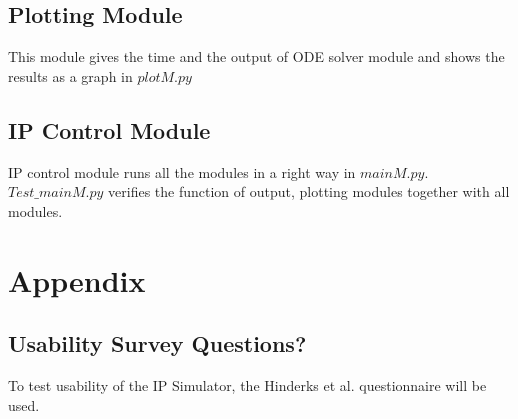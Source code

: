 \documentclass[12pt, titlepage]{article}
\begin{document}
\subsection{Plotting Module}
This module gives the time and the output of ODE solver module and shows the results as a graph in $plotM.py$
\subsection{IP Control Module}
IP control module runs all the modules in a right way in $mainM.py$. $Test\_mainM.py$ verifies the function of output, plotting modules together with all modules.

				




\newpage

\section{Appendix\label{appendix}}

\subsection{Usability Survey Questions?}
To test usability of the IP Simulator, the Hinderks et al. questionnaire \cite{hinderks_schrepp_thomaschewski} will be used.
\newpage{}
\end{document}
